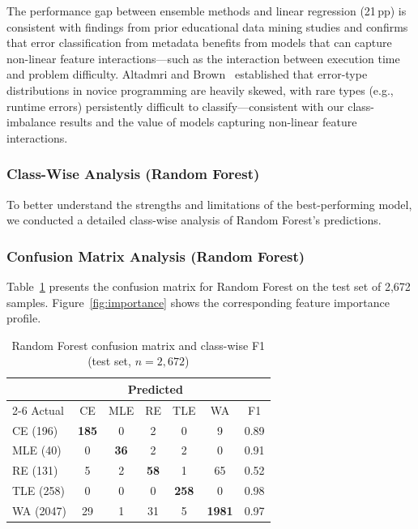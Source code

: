 \documentclass[acmsmall]{acmart}
\begin{document}
The performance gap between ensemble methods and linear regression (21\,pp)
is consistent with findings from prior educational data mining studies
and confirms that error classification from metadata benefits from models
that can capture non-linear feature interactions---such as the interaction
between execution time and problem difficulty. Altadmri and Brown~\cite{altadmri2015most} established that error-type
distributions in novice programming are heavily skewed, with rare types
(e.g., runtime errors) persistently difficult to classify---consistent with
our class-imbalance results and the value of models capturing non-linear
feature interactions.

\subsubsection*{Class-Wise Analysis (Random Forest)}

To better understand the strengths and limitations of the best-performing
model, we conducted a detailed class-wise analysis of Random Forest's
predictions.

\subsubsection*{Confusion Matrix Analysis (Random Forest)}

Table~\ref{tab:rf-cm} presents the confusion matrix for Random Forest on the
test set of 2,672 samples. Figure~\ref{fig:importance} shows the corresponding
feature importance profile.

\begin{table}[htbp]
\centering
\caption{Random Forest confusion matrix and class-wise F1
         (test set, $n=2{,}672$)}
\label{tab:rf-cm}
\begin{tabular}{@{}lccccc|c@{}}
\toprule
& \multicolumn{5}{c}{Predicted} & \\
\cmidrule{2-6}
Actual & CE & MLE & RE & TLE & WA & F1 \\
\midrule
CE (196)  & \textbf{185}  & 0   & 2   & 0   & 9   & 0.89 \\
MLE (40)  & 0   & \textbf{36}   & 2   & 2   & 0   & 0.91 \\
RE (131)  & 5   & 2   & \textbf{58} & 1   & 65  & 0.52 \\
TLE (258) & 0   & 0   & 0   & \textbf{258} & 0   & 0.98 \\
WA (2047) & 29  & 1   & 31  & 5   & \textbf{1981} & 0.97 \\
\bottomrule
\end{tabular}
\end{table}
\end{document}
